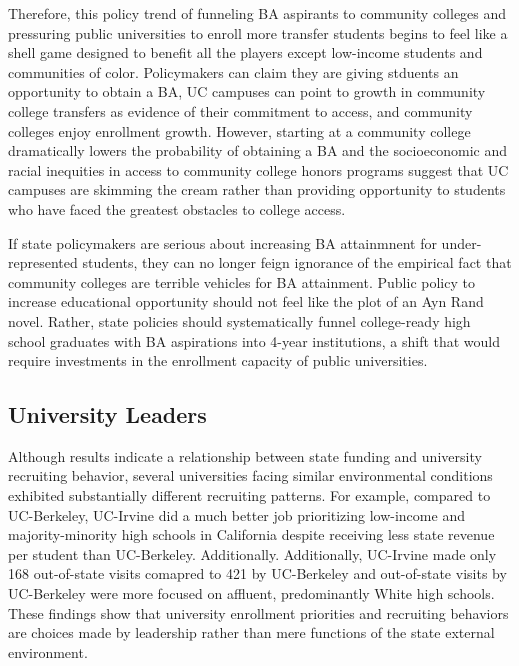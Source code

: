 \documentclass[twoside]{article}
\begin{document}
Therefore, this policy trend of funneling BA aspirants to community colleges and pressuring public universities to enroll more transfer students begins to feel like a shell game designed to benefit all the players except low-income students and communities of color. Policymakers can claim they are giving stduents an opportunity to obtain a BA, UC campuses can point to growth in community college transfers as evidence of their commitment to access, and community colleges enjoy enrollment growth. However, starting at a community college dramatically lowers the probability of obtaining a BA and the socioeconomic and racial inequities in access to community college honors programs suggest that UC campuses are skimming the cream rather than providing opportunity to students who have faced the greatest obstacles to college access.  

If state policymakers are serious about increasing BA attainmnent for under-represented students, they can no longer feign ignorance of the empirical fact that community colleges are terrible vehicles for BA attainment. Public policy to increase educational opportunity should not feel like the plot of an Ayn Rand novel. Rather, state policies should systematically funnel college-ready high school graduates with BA aspirations into 4-year institutions, a shift that would require investments in the enrollment capacity of public universities.

\subsection*{University Leaders}

Although results indicate a relationship between state funding and university recruiting behavior, several universities facing similar environmental conditions exhibited substantially different recruiting patterns. For example, compared to UC-Berkeley, UC-Irvine did a much better job prioritizing low-income and majority-minority high schools in California despite receiving less state revenue per student than UC-Berkeley. Additionally.  Additionally, UC-Irvine made only 168 out-of-state visits comapred to 421 by UC-Berkeley and out-of-state visits by UC-Berkeley were more focused on affluent, predominantly White high schools.  These findings show that university enrollment priorities and recruiting behaviors are choices made by leadership rather than mere functions of the state external environment.
\end{document}

